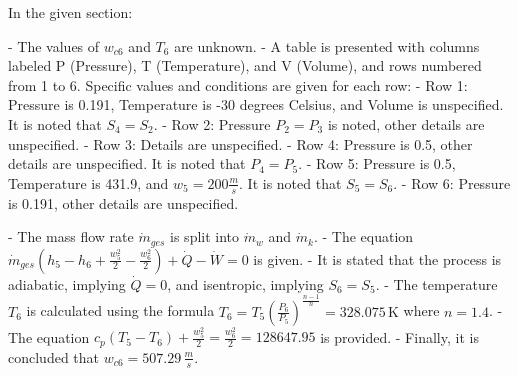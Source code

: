 In the given section:

- The values of \( w_{c6} \) and \( T_6 \) are unknown.
- A table is presented with columns labeled P (Pressure), T (Temperature), and V (Volume), and rows numbered from 1 to 6. Specific values and conditions are given for each row:
  - Row 1: Pressure is 0.191, Temperature is -30 degrees Celsius, and Volume is unspecified. It is noted that \( S_4 = S_2 \).
  - Row 2: Pressure \( P_2 = P_3 \) is noted, other details are unspecified.
  - Row 3: Details are unspecified.
  - Row 4: Pressure is 0.5, other details are unspecified. It is noted that \( P_4 = P_5 \).
  - Row 5: Pressure is 0.5, Temperature is 431.9, and \( w_5 = 200 \frac{m}{s} \). It is noted that \( S_5 = S_6 \).
  - Row 6: Pressure is 0.191, other details are unspecified.

- The mass flow rate \( \dot{m}_{ges} \) is split into \( \dot{m}_w \) and \( \dot{m}_k \).
- The equation \( \dot{m}_{ges} \left( h_5 - h_6 + \frac{w_5^2}{2} - \frac{w_6^2}{2} \right) + \dot{Q} - \dot{W} = 0 \) is given.
- It is stated that the process is adiabatic, implying \( \dot{Q} = 0 \), and isentropic, implying \( S_6 = S_5 \).
- The temperature \( T_6 \) is calculated using the formula \( T_6 = T_5 \left( \frac{P_6}{P_5} \right)^{\frac{n-1}{n}} = 328.075 \, \text{K} \) where \( n = 1.4 \).
- The equation \( c_p (T_5 - T_6) + \frac{w_5^2}{2} = \frac{w_6^2}{2} = 128647.95 \) is provided.
- Finally, it is concluded that \( w_{c6} = 507.29 \, \frac{m}{s} \).